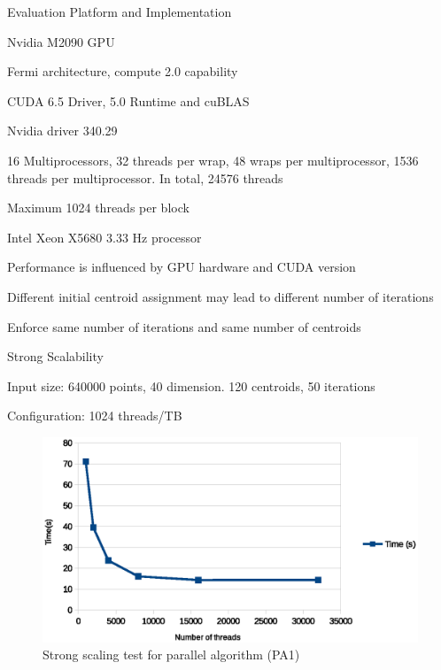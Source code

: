 \documentclass[
nopagebreaks,
style=klope,
fleqn]{powerdot}
\begin{document}
\begin{slide}{Evaluation Platform and Implementation}
  \small
  \begin{compactitem}
  \item{Nvidia M2090 GPU
    \begin{compactitem}
    \item{Fermi architecture, compute 2.0 capability}
    \item{CUDA 6.5 Driver, 5.0 Runtime and cuBLAS}
    \item{Nvidia driver 340.29}
    \item{16 Multiprocessors, 32 threads per wrap, 48 wraps per multiprocessor, 1536 threads per
      multiprocessor. In total, 24576 threads}
    \item{Maximum 1024 threads per block}
    \end{compactitem}
  }
  \item{Intel Xeon X5680 3.33 Hz processor}
  \item{Performance is influenced by GPU hardware and CUDA version}

  \item{Different initial centroid assignment may lead to different number of iterations
    \begin{compactitem}
    \item{Enforce same number of iterations and same number of centroids}
    \end{compactitem}
  }
  \end{compactitem}
\end{slide}

\begin{slide}{Strong Scalability}
  \begin{compactitem}
  \item{Input size: 640000 points, 40 dimension. 120 centroids, 50 iterations}
  \item{Configuration: 1024 threads/TB}
  \end{compactitem}
  \begin{figure}[!h]
    \centering
    \includegraphics[width=0.7\linewidth]{fig/strong_scaling}
    \caption{Strong scaling test for parallel algorithm (PA1)}
    \label{fig:strong_scaling}
  \end{figure}
\end{slide}
\end{document}

